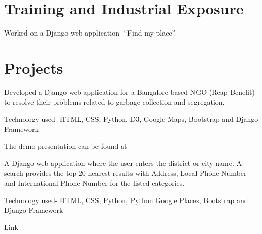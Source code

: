\documentclass[]{deedy-resume-openfont}
\begin{document}
\hfill
\begin{minipage}[t]{0.66\textwidth} 


\section{Training and Industrial Exposure}

\vspace{\topsep} %
\begin{tightemize}\item Worked on a Django web application- “Find-my-place”
\end{tightemize}

\sectionsep


\section{Projects}

Developed a Django web application for a Bangalore based NGO (Reap Benefit) to resolve their problems related to garbage collection and segregation. \\
\begin{tightemize}
\item Technology used- HTML, CSS, Python, D3, Google Maps, Bootstrap and Django Framework
\item The demo presentation can be found at- \href{https:/youtu.be/UP_KwSg6GIk/}{}
\end{tightemize}
\sectionsep

A Django web application where the user enters the district or city name. A search provides the top 20 nearest results with Address, Local Phone Number and International Phone Number for the listed categories. 
\begin{tightemize}
\item Technology used- HTML, CSS, Python, Python Google Places, Bootstrap and Django Framework
\item Link- \href{https://find-my-perfect-place.herokuapp.com/}{}
\end{tightemize}
\sectionsep


\end{minipage}
\end{document}
